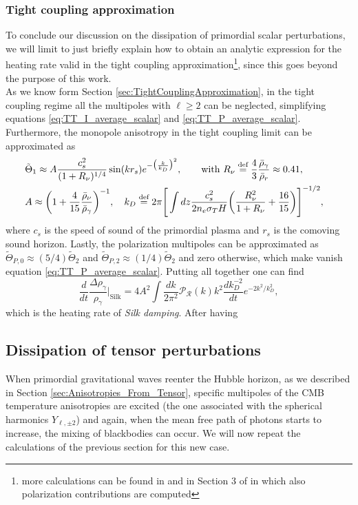 \subsubsection{Tight coupling approximation}
To conclude our discussion on the dissipation of primordial scalar perturbations, we will limit to just briefly explain how to obtain an analytic expression for the heating rate valid in the tight coupling approximation\footnote{more calculations can be found in \cite{Chluba_2x2} and in Section 3 of \cite{Chluba_tens_diss} in which also polarization contributions are computed}, since this goes beyond the purpose of this work.\\
As we know form Section \ref{sec:TightCouplingApproximation}, in the tight coupling regime all the multipoles with $\ell\geq2$ can be neglected, simplifying equations \eqref{eq:TT_I_average_scalar} and \eqref{eq:TT_P_average_scalar}. Furthermore, the monopole anisotropy in the tight coupling limit can be approximated as
\begin{align*}
    &\tilde\Theta_1\approx A\frac{c_s^2}{(1+R_\nu)^{1/4}}\sin(kr_s)e^{-\big(\frac{k}{k_D}\big)^2},\qquad \text{with }R_\nu\stackrel{\text{def}}{=} \frac{4}{3}\frac{\bar\rho_\gamma}{\bar\rho_r}\approx0.41 ,&&\\ &A\approx\bigg(1+\frac{4}{15}\frac{\bar\rho_\nu}{\bar\rho_\gamma}\bigg)^{-1},\quad k_D\stackrel{\text{def}}{=}2\pi\Bigg[\int dz\frac{c_s^2}{2n_e\sigma_T H}\bigg(\frac{R_\nu^2}{1+R_\nu}+\frac{16}{15}\bigg)\Bigg]^{-1/2},&&
\end{align*}
where $c_s$ is the speed of sound of the primordial plasma and $r_s$ is the comoving sound horizon. Lastly, the polarization multipoles can be approximated as $\tilde \Theta_{P,0}\approx (5/4)\tilde\Theta_2$ and $\tilde \Theta_{P,2}\approx (1/4)\tilde\Theta_2$ and zero otherwise, which make vanish equation \eqref{eq:TT_P_average_scalar}. Putting all together one can find 
\begin{equation}
    \frac{d}{dt}\frac{\Delta \rho_\gamma}{\rho_\gamma}\Bigg|_\text{Silk}=4A^2\int\frac{dk}{2\pi^2}\mathcal P_\mathcal R(k)k^2 \frac{dk_D^{-2}}{dt}e^{-2 {k^2}/{k_D^2}},
\end{equation}
which is the heating rate of \emph{Silk damping}. After having 
\subsection{Dissipation of tensor perturbations}
When primordial gravitational waves reenter the Hubble horizon, as we described in Section \ref{sec:Anisotropies_From_Tensor}, specific multipoles of the CMB temperature anisotropies are excited (the one associated with the spherical harmonics $Y_{\ell,\pm2}$) and again, when the mean free path of photons starts to increase, the mixing of blackbodies can occur. We will now repeat the calculations of the previous section for this new case.

